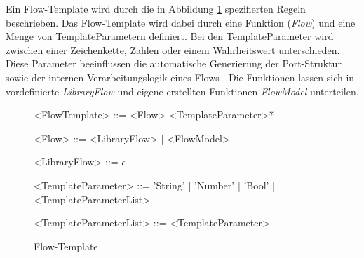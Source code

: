    \noindent
    Ein Flow-Template wird durch die in Abbildung \ref{gra:flow-template} spezifierten Regeln beschrieben.
    Das Flow-Template wird dabei durch eine Funktion (\textit{Flow}) und eine Menge von TemplateParametern definiert. 
    Bei den TemplateParameter wird zwischen einer Zeichenkette, Zahlen oder einem Wahrheitswert unterschieden. 
    Diese Parameter beeinflussen die automatische Generierung der Port-Struktur sowie der internen Verarbeitungslogik eines Flows \cite{99}.
    Die Funktionen lassen sich in vordefinierte \textit{LibraryFlow} und eigene erstellten Funktionen \textit{FlowModel} unterteilen.
    \begin{figure}[H]
        \centering
        \begin{grammar}
            <FlowTemplate> ::= <Flow> <TemplateParameter>*

            <Flow> ::= <LibraryFlow> | <FlowModel>
            
            <LibraryFlow> ::= $\epsilon$

            <TemplateParameter> ::= 'String' | 'Number' | 'Bool' | <TemplateParameterList>
            
            <TemplateParameterList> ::= <TemplateParameter>
        \end{grammar}
        \caption{Flow-Template}    
        \label{gra:flow-template}
    \end{figure}
    \noindent

